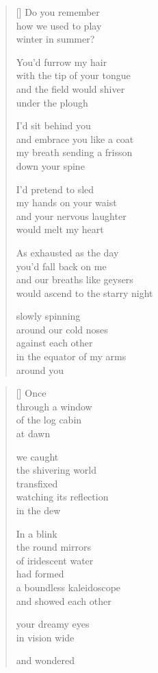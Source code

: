 \documentclass[12pt,a4paper]{article}
\begin{document}
\begin{verse}[\versewidth]
  Do you remember \\
  how we used to play \\
  winter in summer?

  You'd furrow my hair \\
  with the tip of your tongue \\
  and the field would shiver \\
  under the plough

  I'd sit behind you \\
  and embrace you like a coat \\
  my breath sending a frisson \\
  down your spine

  I'd pretend to sled \\
  my hands on your waist \\
  and your nervous laughter \\
  would melt my heart

  As exhausted as the day \\
  you'd fall back on me \\
  and our breaths like geysers \\
  would ascend to the starry night

  slowly spinning \\
  around our cold noses \\
  against each other \\
  in the equator of my arms \\
  around you
\end{verse}


\newpage

\poemtitle{}

\settowidth{\versewidth}{the infinite kaleidoscope}

\bigskip

\begin{verse}[\versewidth]
  Once \\
  through a window \\
  of the log cabin \\
  at dawn

  we caught \\
  the shivering world \\
  transfixed \\
  watching its reflection \\
  in the dew

  In a blink \\
  the round mirrors \\
  of iridescent water \\
  had formed \\
  a boundless kaleidoscope \\
  and showed each other

  your dreamy eyes \\
  in vision wide

  and wondered
\end{verse}
\end{document}
